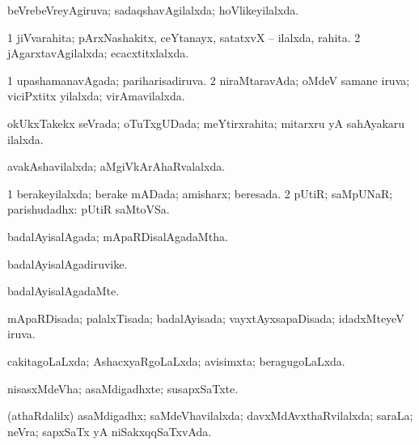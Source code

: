 \bentry
{} 
\gl{\gu}
\expl{}
\bmng
beVrebeVreyAgiruva; sadaqshavAgilalxda; hoVlikeyilalxda. 
\emng
\eentry

\bentry
{} 
\gl{\gu}
\expl{}
\bmng
\bnum
\num{1} jiVvarahita; pArxNashakitx, ceYtanayx, satatxvX -- ilalxda, rahita. 
\num{2} jAgarxtavAgilalxda; ecacxtitxlalxda. 
\enum
\emng
\eentry

\bentry
{} 
\gl{\gu}
\expl{}
\bmng
\bnum
\num{1} upashamanavAgada; pariharisadiruva. 
\num{2} niraMtaravAda; oMdeV samane iruva; viciPxtitx yilalxda; virAmavilalxda. 
\enum
\emng
\eentry

\bentry
{} 
\gl{\gu}
\expl{}
\bmng
okUkxTakekx seVrada; oTuTxgUDada; meYtirxrahita; mitarxru yA sahAyakaru ilalxda. 
\emng
\eentry

\bentry
{} 
\gl{\gu}
\expl{}
\bmng
avakAshavilalxda; aMgiVkArAhaRvalalxda. 
\emng
\eentry

\bentry
{} 
\gl{\gu}
\expl{}
\bmng
\bnum
\num{1} berakeyilalxda; berake mADada; amisharx; beresada. 
\num{2} pUtiR; saMpUNaR; parishudadhx:  pUtiR saMtoVSa. 
\enum
\emng
\eentry

\bentry
{} 
\gl{\gu}
\expl{}
\bmng
badalAyisalAgada; mApaRDisalAgadaMtha. 
\emng
\eentry

\bentry
{} 
\gl{\nA}
\expl{}
\bmng
badalAyisalAgadiruvike. 
\emng
\eentry

\bentry
{} 
\gl{\kirxvi}
\expl{}
\bmng
badalAyisalAgadaMte. 
\emng
\eentry

\bentry
{} 
\gl{\gu}
\expl{}
\bmng
mApaRDisada; palalxTisada; badalAyisada; vayxtAyxsapaDisada; idadxMteyeV iruva. 
\emng
\eentry

\bentry
{} 
\gl{\gu}
\expl{}
\bmng
cakitagoLaLxda; AshacxyaRgoLaLxda; avisimxta; beragugoLaLxda. 
\emng
\eentry

\bentry
{} 
\gl{\nA}
\expl{}
\bmng
nisasxMdeVha; asaMdigadhxte; susapxSaTxte. 
\emng
\eentry

\bentry
{} 
\gl{\gu}
\expl{}
\bmng
(athaRdalilx) asaMdigadhx; saMdeVhavilalxda; davxMdAvxthaRvilalxda; saraLa; neVra; sapxSaTx yA niSakxqqSaTxvAda. 
\emng
\eentry

